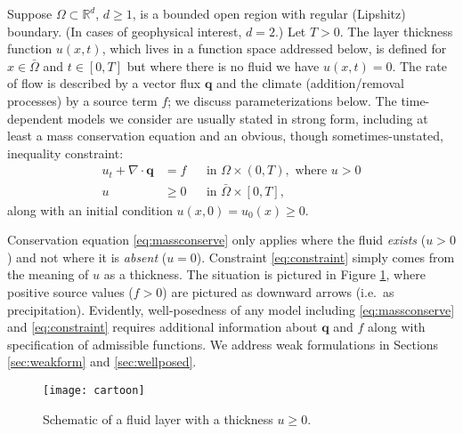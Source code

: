 \documentclass[final,onefignum]{siamart190516}
\newcommand\bq{\mathbf{q}}
\newcommand{\Div}{\nabla\cdot}
\newcommand\RR{\mathbb{R}}
\begin{document}
Suppose $\Omega \subset \RR^d$, $d\ge 1$, is a bounded open region with regular (Lipshitz) boundary.  (In cases of geophysical interest, $d=2$.)  Let $T>0$.  The layer thickness function $u(x,t)$, which lives in a function space addressed below, is defined for $x\in \bar\Omega$ and $t \in [0,T]$ but where there is no fluid we have $u(x,t)=0$.  The rate of flow is described by a vector flux $\bq$ and the climate (addition/removal processes) by a source term $f$; we discuss parameterizations below.  The time-dependent models we consider are usually stated in strong form, including at least a mass conservation equation and an obvious, though sometimes-unstated, inequality constraint:
\begin{align}
u_t + \Div \bq &= f &&\text{in } \Omega \times (0,T), \text{ where } u > 0 \label{eq:massconserve} \\
u &\ge 0 &&\text{in } \bar\Omega \times [0,T], \label{eq:constraint}
\end{align}
along with an initial condition $u(x,0)=u_0(x)\ge 0$.

Conservation equation \eqref{eq:massconserve} only applies where the fluid \emph{exists} ($u>0$) and not where it is \emph{absent} ($u=0$).  Constraint \eqref{eq:constraint} simply comes from the meaning of $u$ as a thickness.  The situation is pictured in Figure \ref{fig:cartoon}, where positive source values ($f>0$) are pictured as downward arrows (i.e.~as precipitation).  Evidently, well-posedness of any model including \eqref{eq:massconserve} and \eqref{eq:constraint} requires additional information about $\bq$ and $f$ along with specification of admissible functions.  We address weak formulations in Sections \ref{sec:weakform} and \ref{sec:wellposed}.

\begin{figure}[ht]
\centerline{\texttt{[image: cartoon]}}
\caption{Schematic of a fluid layer with a thickness $u\ge 0$.}
\label{fig:cartoon}
\end{figure}
\end{document}
